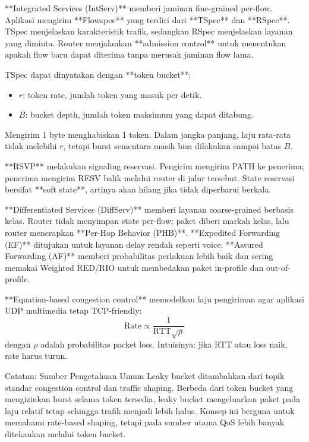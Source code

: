 **Integrated Services (IntServ)** memberi jaminan fine-grained per-flow. Aplikasi mengirim **Flowspec** yang terdiri dari **TSpec** dan **RSpec**. TSpec menjelaskan karakteristik trafik, sedangkan RSpec menjelaskan layanan yang diminta. Router menjalankan **admission control** untuk menentukan apakah flow baru dapat diterima tanpa merusak jaminan flow lama.

TSpec dapat dinyatakan dengan **token bucket**:
\begin{itemize}
    \item $r$: token rate, jumlah token yang masuk per detik.
    \item $B$: bucket depth, jumlah token maksimum yang dapat ditabung.
\end{itemize}
Mengirim 1 byte menghabiskan 1 token. Dalam jangka panjang, laju rata-rata tidak melebihi $r$, tetapi burst sementara masih bisa dilakukan sampai batas $B$.

**RSVP** melakukan signaling reservasi. Pengirim mengirim PATH ke penerima; penerima mengirim RESV balik melalui router di jalur tersebut. State reservasi bersifat **soft state**, artinya akan hilang jika tidak diperbarui berkala.

**Differentiated Services (DiffServ)** memberi layanan coarse-grained berbasis kelas. Router tidak menyimpan state per-flow; paket diberi markah kelas, lalu router menerapkan **Per-Hop Behavior (PHB)**. **Expedited Forwarding (EF)** ditujukan untuk layanan delay rendah seperti voice. **Assured Forwarding (AF)** memberi probabilitas perlakuan lebih baik dan sering memakai Weighted RED/RIO untuk membedakan paket in-profile dan out-of-profile.

**Equation-based congestion control** memodelkan laju pengiriman agar aplikasi UDP multimedia tetap TCP-friendly:
\[
    \text{Rate} \propto \frac{1}{\text{RTT}\sqrt{\rho}}
\]
dengan $\rho$ adalah probabilitas packet loss. Intuisinya: jika RTT atau loss naik, rate harus turun.

\begin{cmt}{Catatan: Sumber Pengetahuan Umum}{}
Leaky bucket ditambahkan dari topik standar congestion control dan traffic shaping. Berbeda dari token bucket yang mengizinkan burst selama token tersedia, leaky bucket mengeluarkan paket pada laju relatif tetap sehingga trafik menjadi lebih halus. Konsep ini berguna untuk memahami rate-based shaping, tetapi pada sumber utama QoS lebih banyak ditekankan melalui token bucket.
\end{cmt}

